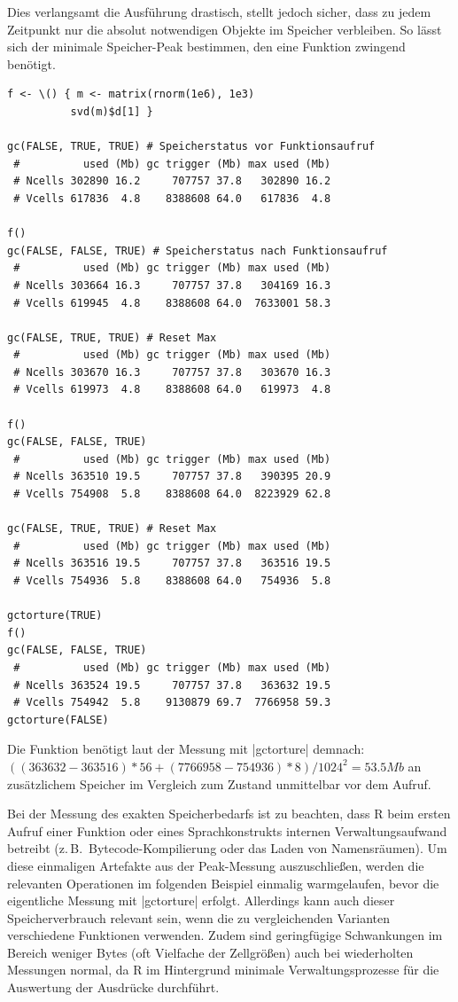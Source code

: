 \documentclass[10pt,twocolumn]{scrartcl}
\renewcommand{\lstinline}{\mycoloredinline}
\begin{document}
Dies verlangsamt die Ausführung drastisch, stellt jedoch sicher, dass zu jedem Zeitpunkt nur die absolut notwendigen Objekte im Speicher verbleiben. So lässt sich der minimale Speicher-Peak bestimmen, den eine Funktion zwingend benötigt.

\begin{lstlisting}
f <- \() { m <- matrix(rnorm(1e6), 1e3)
          svd(m)$d[1] }

gc(FALSE, TRUE, TRUE) # Speicherstatus vor Funktionsaufruf
 #          used (Mb) gc trigger (Mb) max used (Mb)
 # Ncells 302890 16.2     707757 37.8   302890 16.2
 # Vcells 617836  4.8    8388608 64.0   617836  4.8

f()
gc(FALSE, FALSE, TRUE) # Speicherstatus nach Funktionsaufruf
 #          used (Mb) gc trigger (Mb) max used (Mb)
 # Ncells 303664 16.3     707757 37.8   304169 16.3
 # Vcells 619945  4.8    8388608 64.0  7633001 58.3

gc(FALSE, TRUE, TRUE) # Reset Max
 #          used (Mb) gc trigger (Mb) max used (Mb)
 # Ncells 303670 16.3     707757 37.8   303670 16.3
 # Vcells 619973  4.8    8388608 64.0   619973  4.8

f()
gc(FALSE, FALSE, TRUE)
 #          used (Mb) gc trigger (Mb) max used (Mb)
 # Ncells 363510 19.5     707757 37.8   390395 20.9
 # Vcells 754908  5.8    8388608 64.0  8223929 62.8

gc(FALSE, TRUE, TRUE) # Reset Max
 #          used (Mb) gc trigger (Mb) max used (Mb)
 # Ncells 363516 19.5     707757 37.8   363516 19.5
 # Vcells 754936  5.8    8388608 64.0   754936  5.8

gctorture(TRUE)
f()
gc(FALSE, FALSE, TRUE)
 #          used (Mb) gc trigger (Mb) max used (Mb)
 # Ncells 363524 19.5     707757 37.8   363632 19.5
 # Vcells 754942  5.8    9130879 69.7  7766958 59.3
gctorture(FALSE)
\end{lstlisting}

Die Funktion benötigt laut der Messung mit \lstinline|gctorture| demnach: $((363632 - 363516) * 56 + (7766958 - 754936) * 8) / 1024^2 = 53.5Mb$ an zusätzlichem Speicher im Vergleich zum Zustand unmittelbar vor dem Aufruf.

Bei der Messung des exakten Speicherbedarfs ist zu beachten, dass R beim ersten Aufruf einer Funktion oder eines Sprachkonstrukts internen Verwaltungsaufwand betreibt (z.\,B.\ Bytecode-Kompilierung oder das Laden von Namensräumen). Um diese einmaligen Artefakte aus der Peak-Messung auszuschließen, werden die relevanten Operationen im folgenden Beispiel einmalig warmgelaufen, bevor die eigentliche Messung mit \lstinline|gctorture| erfolgt. Allerdings kann auch dieser Speicherverbrauch relevant sein, wenn die zu vergleichenden Varianten verschiedene Funktionen verwenden. Zudem sind geringfügige Schwankungen im Bereich weniger Bytes (oft Vielfache der Zellgrößen) auch bei wiederholten Messungen normal, da R im Hintergrund minimale Verwaltungsprozesse für die Auswertung der Ausdrücke durchführt.
\end{document}
